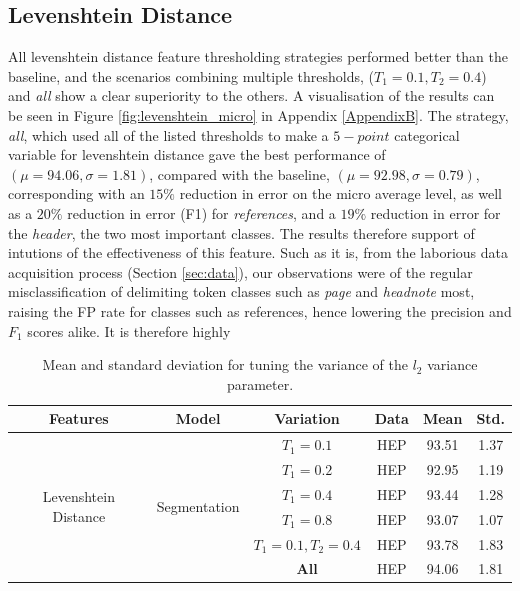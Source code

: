 \subsection{Levenshtein Distance}

All levenshtein distance feature thresholding strategies performed better than the baseline, and the scenarios combining multiple thresholds, ($T_1 = 0.1, T_2 = 0.4$) and \emph{all} show a clear superiority to the others. A visualisation of the results can be seen in Figure \ref{fig:levenshtein_micro} in Appendix \ref{AppendixB}. The strategy, \emph{all}, which used all of the listed thresholds to make a $5-point$ categorical variable for levenshtein distance gave the best performance of $(\mu = 94.06, \sigma = 1.81)$, compared with the baseline, $(\mu = 92.98, \sigma = 0.79)$, corresponding with an $15\%$ reduction in error on the micro average level, as well as a $20\%$ reduction in error (F1) for \emph{references}, and a $19\%$ reduction in error for the \emph{header}, the two most important classes. The results therefore support of intutions of the effectiveness of this feature. Such as it is, from the laborious data acquisition process (Section \ref{sec:data}), our observations were of the regular misclassification of delimiting token classes such as \emph{page} and \emph{headnote} most, raising the FP rate for classes such as references, hence lowering the precision and $F_1$ scores alike. It is therefore highly  

\begin{table}[h]
\begin{center}
\begin{tabular}{|c|c|c|c|c|c|}
\hline
Features & Model & Variation & Data & Mean & Std.\\
\hline
\multirow{6}{*}{Levenshtein Distance} & \multirow{6}{*}{Segmentation} & $T_1 = 0.1$ & HEP & 93.51 & 1.37\\\cline{3-6}
& & $T_1 = 0.2$ & HEP & 92.95 & 1.19\\\cline{3-6}
& & $T_1 = 0.4$ & HEP & 93.44 & 1.28\\\cline{3-6}
& & $T_1 = 0.8$ & HEP & 93.07 & 1.07\\\cline{3-6}
& & $T_1 = 0.1, T_2 = 0.4$ & HEP & 93.78 & 1.83\\\cline{3-6}
& & \textbf{All} & HEP & 94.06 & 1.81\\\cline{3-6}
\hline
\end{tabular}
\caption[Mean and standard deviation for tuning the variance of the $l_2$ variance parameter.]{Mean and standard deviation for tuning the variance of the $l_2$ variance parameter.}
\label{table:levenshteinresults}
\end{center}
\end{table}

